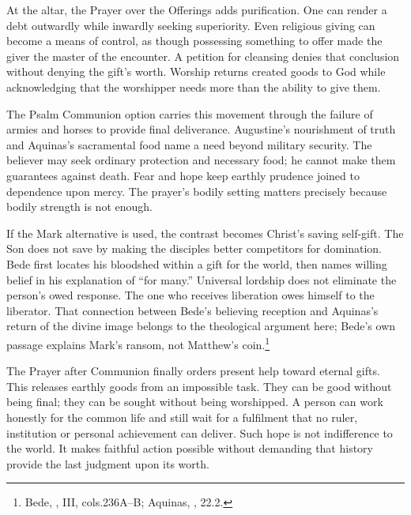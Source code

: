 At the altar, the Prayer over the Offerings adds purification. One can render a debt outwardly while inwardly seeking superiority. Even religious giving can become a means of control, as though possessing something to offer made the giver the master of the encounter. A petition for cleansing denies that conclusion without denying the gift's worth. Worship returns created goods to God while acknowledging that the worshipper needs more than the ability to give them.

The Psalm Communion option carries this movement through the failure of armies and horses to provide final deliverance. Augustine's nourishment of truth and Aquinas's sacramental food name a need beyond military security. The believer may seek ordinary protection and necessary food; he cannot make them guarantees against death. Fear and hope keep earthly prudence joined to dependence upon mercy. The prayer's bodily setting matters precisely because bodily strength is not enough.

If the Mark alternative is used, the contrast becomes Christ's saving self-gift. The Son does not save by making the disciples better competitors for domination. Bede first locates his bloodshed within a gift for the world, then names willing belief in his explanation of ``for many.'' Universal lordship does not eliminate the person's owed response. The one who receives liberation owes himself to the liberator. That connection between Bede's believing reception and Aquinas's return of the divine image belongs to the theological argument here; Bede's own passage explains Mark's ransom, not Matthew's coin.\footnote{Bede, , III, cols.236A--B; Aquinas, , 22.2.}

The Prayer after Communion finally orders present help toward eternal gifts. This releases earthly goods from an impossible task. They can be good without being final; they can be sought without being worshipped. A person can work honestly for the common life and still wait for a fulfilment that no ruler, institution or personal achievement can deliver. Such hope is not indifference to the world. It makes faithful action possible without demanding that history provide the last judgment upon its worth.

